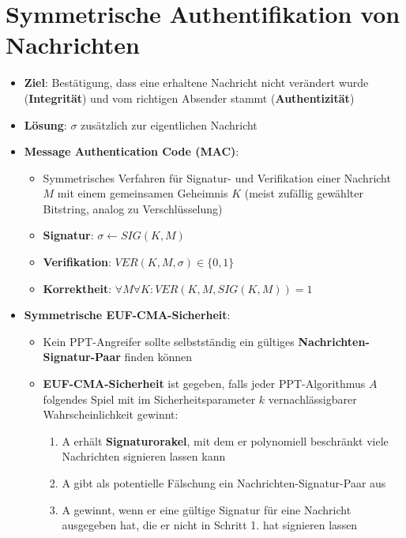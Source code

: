 \section{Symmetrische Authentifikation von Nachrichten}%
\label{symauth:sec:symmetrische_authentifikation_von_nachrichten}

\begin{itemize}
	\item \textbf{Ziel}: Bestätigung, dass eine erhaltene Nachricht nicht verändert wurde (\textbf{Integrität}) und vom richtigen Absender stammt (\textbf{Authentizität})
	\item \textbf{Lösung}:  $\sigma$ zusätzlich zur eigentlichen Nachricht
	\item \textbf{Message Authentication Code (MAC)}:
	\begin{itemize}
		\item Symmetrisches Verfahren für Signatur- und Verifikation einer Nachricht $M$ mit einem gemeinsamen Geheimnis $K$ (meist zufällig gewählter Bitstring, analog zu Verschlüsselung)
		\item \textbf{Signatur}: $\sigma \leftarrow SIG(K, M)$
		\item \textbf{Verifikation}: $VER(K, M, \sigma) \in \{0, 1\}$
		\item \textbf{Korrektheit}: $\forall M \forall K: VER(K, M, SIG(K, M)) = 1$
	\end{itemize}
	\item \textbf{Symmetrische EUF-CMA-Sicherheit}:
	\begin{itemize}
		\item Kein PPT-Angreifer sollte selbstständig ein gültiges \textbf{Nachrichten-Signatur-Paar} finden können
		\item \textbf{EUF-CMA-Sicherheit} ist gegeben, falls jeder PPT-Algorithmus $A$ folgendes Spiel mit im Sicherheitsparameter $k$ vernachlässigbarer Wahrscheinlichkeit gewinnt:
		\begin{enumerate}
			\item A erhält \textbf{Signaturorakel}, mit dem er polynomiell beschränkt viele Nachrichten signieren lassen kann
			\item A gibt als potentielle Fälschung ein Nachrichten-Signatur-Paar aus
			\item A gewinnt, wenn er eine gültige Signatur für eine Nachricht ausgegeben hat, die er nicht in Schritt 1. hat signieren lassen
		\end{enumerate}
	\end{itemize}

\end{itemize}
